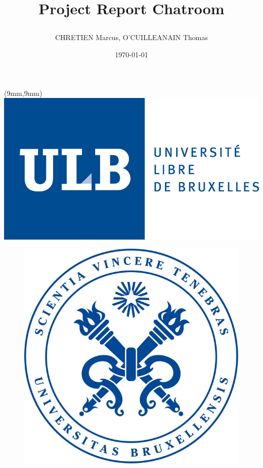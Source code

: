 \documentclass[utf8]{article}
\begin{document}
\begin{titlepage}
\begin{textblock*}{5cm}(9mm,9mm)
\includegraphics[scale=0.5]{ULB.jpg}
\end{textblock*}
\author{CHRETIEN Marcus, O'CUILLEANAIN Thomas}
\date{\today}
\title{
    \begin{minipage}\linewidth
        \centering
        Project Report
        \vskip10pt
        \large\textbf{Chatroom}
    \end{minipage}
}
\maketitle
\centering
\begin{figure}[H]
  \centering
	\includegraphics[scale=0.4]{SVT.png}
  \label{fig:logo}
\end{figure}
\end{titlepage}
\end{document}
